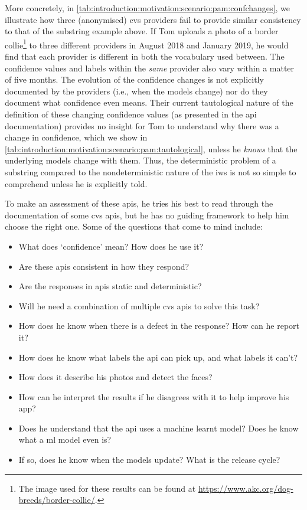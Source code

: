 

More concretely, in \cref{tab:introduction:motivation:scenario:pam:confchanges}, we illustrate how three (anonymised) \gls{cvs} providers fail to provide similar consistency to that of the substring example above. If Tom uploads a photo of a border collie\footnote{The image used for these results can be found at \url{https://www.akc.org/dog-breeds/border-collie/}.} to three different providers in August 2018 and January 2019, he would find that each provider is different in both the vocabulary used between. The confidence values and labels within the \textit{same} provider also vary within a matter of five months. The evolution of the confidence changes is not explicitly documented by the providers (i.e., when the models change) nor do they document what confidence even means. Their current tautological nature of the definition of these changing confidence values (as presented in the \gls{api} documentation) provides no insight for Tom to understand why there was a change in confidence, which we show in \cref{tab:introduction:motivation:scenario:pam:tautological}, unless he \textit{knows} that the underlying models change with them. Thus, the deterministic problem of a substring compared to the nondeterministic nature of the \gls{iws} is not so simple to comprehend unless he is explicitly told.




To make an assessment of these \glspl{api}, he tries his best to read through the documentation of some \gls{cvs} \glspl{api}, but he has no guiding framework to help him choose the right one. Some of the questions that come to mind include:

\begin{itemize}
  \item What does `confidence' mean? How does he use it?
  \item Are these \glspl{api} consistent in how they respond?
  \item Are the responses in \glspl{api} static and deterministic?
  \item Will he need a combination of multiple \gls{cvs} \glspl{api} to solve this task?
  \item How does he know when there is a defect in the response? How can he report it?
  \item How does he know what labels the \gls{api} can pick up, and what labels it can't?
  \item How does it describe his photos and detect the faces?
  \item How can he interpret the results if he disagrees with it to help improve his app?
  \item Does he understand that the \gls{api} uses a machine learnt model? Does he know what a \gls{ml} model even is?
  \item If so, does he know when the models update? What is the release cycle?
\end{itemize}

